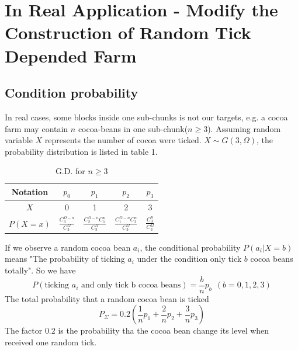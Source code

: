 \documentclass[UTF8,a4paper,15pt,titlepage,scale=0.8]{article}
\begin{document}
\section{In Real Application - Modify the Construction of Random Tick Depended Farm}
    \subsection{Condition probability}
        In real cases, some blocks inside one sub-chunks is not our targets, e.g. a cocoa farm may contain $n$ cocoa-beans in one sub-chunk($n\geq 3$). Assuming random variable $X$ represents the number of cocoa were ticked. $X \sim G(3,\Omega)$, the probability distribution is listed in table 1.
            \begin{table}[H]
                \centering
                \begin{tabular}{c|c|c|c|c}
                    \hline
                    Notation&$p_0$&$p_1$&$p_2$&$p_3$\\
                    \hline
                    $X$&0&1&2&3\\
                    \hline
                    $P(X=x)$&$\frac{C_3^{\Omega-n}}{C_3^{\Omega}}$&$\frac{C_2^{\Omega - n}C_1^n}{C_3^{\Omega}}$&$\frac{C_1^{\Omega-n}C_2^n}{C_3^{\Omega}}$&$\frac{C_3^n}{C_3^{\Omega}}$\\
                    \hline
                \end{tabular}
                \caption{G.D. for $n\ge 3$}
            \end{table}
        If we observe a random cocoa bean $a_i$, the conditional probability $P(a_i| X=b)$ means "The probability of ticking $a_i$ under the condition only tick $b$ cocoa beans totally". So we have 
            \begin{equation}
                P(\text{ticking $a_i$ and only tick b cocoa beans}) = \frac{b}{n}p_b \ \ (b=0,1,2,3)
            \end{equation}
        The total probability that a random cocoa bean is ticked 
            \begin{equation}
                P_\Sigma = 0.2 (\frac{1}{n}p_1 + \frac{2}{n}p_2 + \frac{3}{n}p_3)
            \end{equation}
        The factor $0.2$ is the probability tha the cocoa bean change its level when received one random tick.
\end{document}

